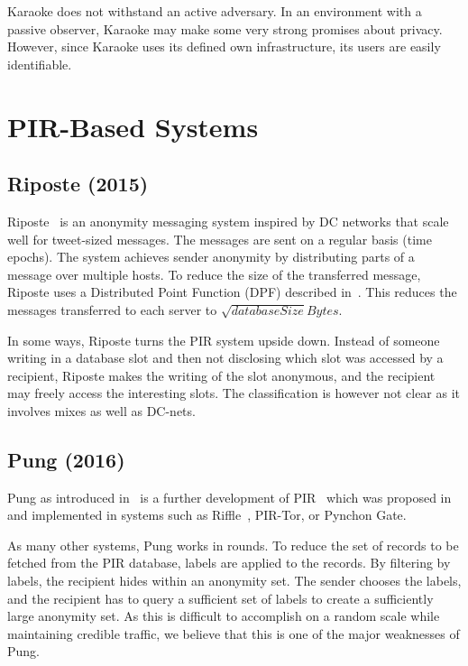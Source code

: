 Karaoke does not withstand an active adversary. In an environment with a passive observer, Karaoke may make some very strong promises about privacy. However, since Karaoke uses its defined own infrastructure, its users are easily identifiable.

\section{PIR-Based Systems}

\subsection{Riposte (2015)}
Riposte~\cite{corrigan2015riposte} is an anonymity messaging system inspired by DC networks that scale well for tweet-sized messages. The messages are sent on a regular basis (time epochs). The system achieves sender anonymity by distributing parts of a message over multiple hosts. To reduce the size of the transferred message, Riposte uses a Distributed Point Function (DPF) described in~\cite{gilboa2014distributed}. This reduces the messages transferred to each server to $\sqrt{databaseSize} Bytes$.

In some ways, Riposte turns the PIR system upside down. Instead of someone writing in a database slot and then not disclosing which slot was accessed by a recipient, Riposte makes the writing of the slot anonymous, and the recipient may freely access the interesting slots. The classification is however not clear as it involves mixes as well as DC-nets.


\subsection{Pung (2016)}
Pung as introduced in~\cite{angel2016unobservable} is a further development of PIR~\cite{chor1995private} which was proposed in \citeyear{chor1995private} and implemented in systems such as Riffle~\cite{kwon2016riffle}, PIR-Tor, or Pynchon Gate.

As many other systems, Pung works in rounds. To reduce the set of records to be fetched from the PIR database, labels are applied to the records. By filtering by labels, the recipient hides within an anonymity set. The sender chooses the labels, and the recipient has to query a sufficient set of labels to create a sufficiently large anonymity set. As this is difficult to accomplish on a random scale while maintaining credible traffic, we believe that this is one of the major weaknesses of Pung.

